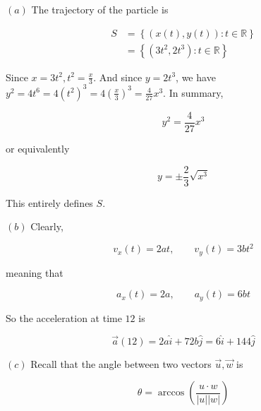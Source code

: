 \documentclass[12pt]{article}
\theoremstyle{definition}
\begin{document}
$(a)$ 
The trajectory of the particle is 

\begin{align*}
    S 
&= \left\{ (x(t), y(t)) : t \in
\mathbb{R} \right\}  \\ 
&= \left\{ (3t^2, 2t^3) : t \in \mathbb{R} \right\} 
\end{align*}

Since $x = 3t^2, t^2 = \frac{x}{3}$. And since $y = 2t^3$, we have 
$y^2 = 4t^6 = 4 (t^2)^3 = 4\left( \frac{x}{3} \right)^3 = \frac{4}{27}x^3 $. In
summary, 

\begin{equation*}
    y^2 = \frac{4}{27}x^3
\end{equation*}

or equivalently 

\begin{equation*}
    y = \pm \frac{2}{3}\sqrt{x^3} 
\end{equation*}

This entirely defines $S$.




$(b)$ Clearly, 

\begin{equation*}
    v_x(t) = 2at, \qquad v_y(t) = 3bt^2
\end{equation*}

meaning that 

\begin{equation*}
    a_x(t) = 2a, \qquad a_y(t) = 6bt
\end{equation*}

So the acceleration at time $12$ is 

\begin{equation*}
    \vec{a}(12) = 2a\hat{i} + 72b \hat{j} = 6\hat{i} + 144\hat{j}
\end{equation*}

$(c)$ Recall that the angle between two vectors $\vec{u}, \vec{w}$ is 

\begin{equation*}
    \theta = \arccos \left( \frac{ u \cdot w }{\left| u \right|\left| w \right|  } \right) 
\end{equation*}
\end{document}
